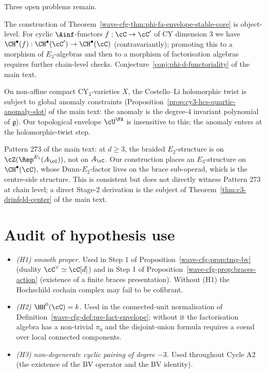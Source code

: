 Three open problems remain.

\begin{openproblem}
\label{wave-cfg-op:morphism-functoriality}
The construction of Theorem~\ref{wave-cfg-thm:phi-fa-envelope-stable-core}
is object-level. For cyclic $\Ainf$-functors $f:\cC\to\cC'$ of CY
dimension $3$ we have
$\CH^\bullet(f):\CH^\bullet(\cC')\to\CH^\bullet(\cC)$ (contravariantly);
promoting this to a morphism of $E_3$-algebras and then to a morphism
of factorisation algebras requires further chain-level checks.
Conjecture~\ref{conj:phi-d-functoriality} of the main text.
\end{openproblem}

\begin{openproblem}
\label{wave-cfg-op:global-compact-cy3}
On non-affine compact CY$_3$-varieties $X$, the Costello--Li
holomorphic twist is subject to global anomaly constraints
(Proposition~\ref{prop:cy3-hcs-quartic-anomaly-slot} of the main
text: the anomaly is the degree-$4$ invariant polynomial of
$\mathfrak g$). Our topological envelope $\cU^\FA$ is insensitive to
this; the anomaly enters at the holomorphic-twist step.
\end{openproblem}

\begin{openproblem}
\label{wave-cfg-op:e2-on-centre}
Pattern 273 of the main text: at $d\geq 3$, the braided
$E_2$-structure is on $\cZ(\Rep^{E_1}(A_\cC))$, not on $A_\cC$. Our
construction places an $E_3$-structure on $\CH^\bullet(\cC)$, whose
Dunn-$E_2$-factor lives on the brace sub-operad, which is the
centre-side structure. This is consistent but does not directly
witness Pattern 273 at chain level; a direct Stage-$2$ derivation is
the subject of Theorem~\ref{thm:c3-drinfeld-center} of the main text.
\end{openproblem}

\section*{Audit of hypothesis use}

\begin{itemize}
\item\emph{(H1) smooth proper.} Used in Step 1 of
Proposition~\ref{wave-cfg-prop:tmg-bv} (duality $\cC^\vee\simeq\cC[d]$)
and in Step 1 of
Proposition~\ref{wave-cfg-prop:braces-action} (existence of a finite
braces presentation). Without (H1) the Hochschild cochain complex may
fail to be cofibrant.
\item\emph{(H2) $\HH^0(\cC)=k$.} Used in the connected-unit
normalisation of
Definition~\ref{wave-cfg-def:pre-fact-envelope}; without it the
factorisation algebra has a non-trivial $\pi_0$ and the disjoint-union
formula requires a coend over local connected components.
\item\emph{(H3) non-degenerate cyclic pairing of degree $-3$.} Used
throughout Cycle A2 (the existence of the BV operator and the BV
identity).
\end{itemize}

